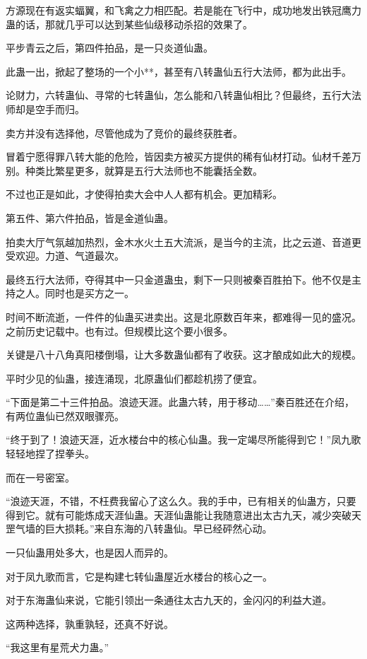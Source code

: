 \begin{this_body}
方源现在有返实蝠翼，和飞禽之力相匹配。若是能在飞行中，成功地发出铁冠鹰力蛊的话，那就几乎可以达到某些仙级移动杀招的效果了。

平步青云之后，第四件拍品，是一只炎道仙蛊。

此蛊一出，掀起了整场的一个小**，甚至有八转蛊仙五行大法师，都为此出手。

论财力，六转蛊仙、寻常的七转蛊仙，怎么能和八转蛊仙相比？但最终，五行大法师却是空手而归。

卖方并没有选择他，尽管他成为了竞价的最终获胜者。

冒着宁愿得罪八转大能的危险，皆因卖方被买方提供的稀有仙材打动。仙材千差万别。种类比繁星更多，就算是五行大法师也不能囊括全数。

不过也正是如此，才使得拍卖大会中人人都有机会。更加精彩。

第五件、第六件拍品，皆是金道仙蛊。

拍卖大厅气氛越加热烈，金木水火土五大流派，是当今的主流，比之云道、音道更受欢迎。力道、气道最次。

最终五行大法师，夺得其中一只金道蛊虫，剩下一只则被秦百胜拍下。他不仅是主持之人。同时也是买方之一。

时间不断流逝，一件件的仙蛊买进卖出。这是北原数百年来，都难得一见的盛况。之前历史记载中。也有过。但规模比这个要小很多。

关键是八十八角真阳楼倒塌，让大多数蛊仙都有了收获。这才酿成如此大的规模。

平时少见的仙蛊，接连涌现，北原蛊仙们都趁机捞了便宜。

“下面是第二十三件拍品。浪迹天涯。此蛊六转，用于移动……”秦百胜还在介绍，有两位蛊仙已然双眼骤亮。

“终于到了！浪迹天涯，近水楼台中的核心仙蛊。我一定竭尽所能得到它！”凤九歌轻轻地捏了捏拳头。

而在一号密室。

“浪迹天涯，不错，不枉费我留心了这么久。我的手中，已有相关的仙蛊方，只要得到它。就有可能炼成天涯仙蛊。天涯仙蛊能让我随意进出太古九天，减少突破天罡气墙的巨大损耗。”来自东海的八转蛊仙。早已经砰然心动。

一只仙蛊用处多大，也是因人而异的。

对于凤九歌而言，它是构建七转仙蛊屋近水楼台的核心之一。

对于东海蛊仙来说，它能引领出一条通往太古九天的，金闪闪的利益大道。

这两种选择，孰重孰轻，还真不好说。

“我这里有星荒犬力蛊。”


\end{this_body}
